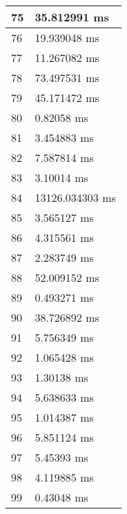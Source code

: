 \begin{multicols}{2}
\begin{tabular}{|l|l|}
		75 & 35.812991 ms \\ \hline
		76 & 19.939048 ms \\ \hline
		77 & 11.267082 ms \\ \hline
		78 & 73.497531 ms \\ \hline
		79 & 45.171472 ms \\ \hline
		80 & 0.82058 ms \\ \hline
		81 & 3.454883 ms \\ \hline
		82 & 7.587814 ms \\ \hline
		83 & 3.10014 ms \\ \hline
		84 & 13126.034303 ms \\ \hline
		85 & 3.565127 ms \\ \hline
		86 & 4.315561 ms \\ \hline
		87 & 2.283749 ms \\ \hline
		88 & 52.009152 ms \\ \hline
		89 & 0.493271 ms \\ \hline
		90 & 38.726892 ms \\ \hline
		91 & 5.756349 ms \\ \hline
		92 & 1.065428 ms \\ \hline
		93 & 1.30138 ms \\ \hline
		94 & 5.638633 ms \\ \hline
		95 & 1.014387 ms \\ \hline
		96 & 5.851124 ms \\ \hline
		97 & 5.45393 ms \\ \hline
		98 & 4.119885 ms \\ \hline
		99 & 0.43048 ms \\ \hline
	\end{tabular}\\
\end{multicols}\pagebreak
